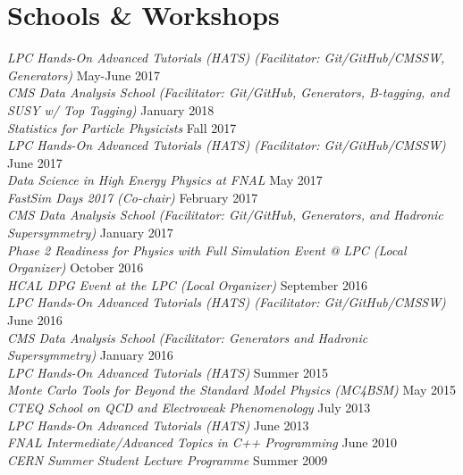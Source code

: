 \section{Schools \& Workshops}
{\sl LPC Hands-On Advanced Tutorials (HATS) (Facilitator: Git/GitHub/CMSSW, Generators)} \hfill May-June 2017\\
{\sl CMS Data Analysis School (Facilitator: Git/GitHub, Generators, B-tagging, and SUSY w/ Top Tagging)} \hfill January 2018\\
{\sl Statistics for Particle Physicists} \hfill Fall 2017\\
{\sl LPC Hands-On Advanced Tutorials (HATS) (Facilitator: Git/GitHub/CMSSW)} \hfill June 2017\\
{\sl Data Science in High Energy Physics at FNAL} \hfill May 2017\\
{\sl FastSim Days 2017 (Co-chair)} \hfill February 2017\\
{\sl CMS Data Analysis School (Facilitator: Git/GitHub, Generators, and Hadronic Supersymmetry)} \hfill January 2017\\
{\sl Phase 2 Readiness for Physics with Full Simulation Event @ LPC (Local Organizer)} \hfill October 2016\\
{\sl HCAL DPG Event at the LPC (Local Organizer)} \hfill September 2016\\
{\sl LPC Hands-On Advanced Tutorials (HATS) (Facilitator: Git/GitHub/CMSSW)} \hfill June 2016\\
{\sl CMS Data Analysis School (Facilitator: Generators and Hadronic Supersymmetry)} \hfill January 2016\\
{\sl LPC Hands-On Advanced Tutorials (HATS)} \hfill Summer 2015\\
{\sl Monte Carlo Tools for Beyond the Standard Model Physics (MC4BSM)} \hfill May 2015\\
{\sl CTEQ School on QCD and Electroweak Phenomenology} \hfill July 2013\\
{\sl LPC Hands-On Advanced Tutorials (HATS)} \hfill June 2013\\
{\sl FNAL Intermediate/Advanced Topics in C++ Programming} \hfill June 2010\\
{\sl CERN Summer Student Lecture Programme} \hfill Summer 2009%